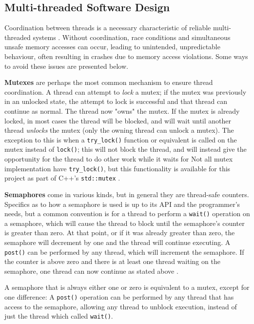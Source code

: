 \documentclass[11pt, a4paper, twocolumn]{article}
\begin{document}
\subsection{Multi-threaded Software Design}

Coordination between threads is a necessary characteristic of reliable multi-threaded systems \citep{Powell}. Without coordination, race conditions and simultaneous unsafe memory accesses can occur, leading to unintended, unpredictable behaviour, often resulting in crashes due to memory access violations. Some ways to avoid these issues are presented below.

\textbf{Mutexes} are perhaps the most common mechanism to ensure thread coordination. A thread can attempt to \emph{lock} a mutex; if the mutex was previously in an unlocked state, the attempt to lock is successful and that thread can continue as normal. The thread now "owns" the mutex. If the mutex is already locked, in most cases the thread will be blocked, and will wait until another thread \emph{unlocks} the mutex (only the owning thread can unlock a mutex). The exception to this is when a \verb|try_lock()| function or equivalent is called on the mutex instead of \verb|lock()|; this will not block the thread, and will instead give the opportunity for the thread to do other work while it waits for  Not all mutex implementation have \verb|try_lock()|, but this functionality is available for this project as part of C++'s \verb|std::mutex| \citep{CppMutex}.

\textbf{Semaphores} come in various kinds, but in general they are thread-safe counters. Specifics as to how a semaphore is used is up to its API and the programmer's needs, but a common convention is for a thread to perform a \verb|wait()| operation on a semaphore, which will cause the thread to block until the semaphore's counter is greater than zero. At that point, or if it was already greater than zero, the semaphore will decrement by one and the thread will continue executing. A \verb|post()| can be performed by any thread, which will increment the semaphore. If the counter is above zero and there is at least one thread waiting on the semaphore, one thread can now continue as stated above \citep{BoostSync}.

A semaphore that is always either one or zero is equivalent to a mutex, except for one difference: A \verb|post()| operation can be performed by any thread that has access to the semaphore, allowing any thread to unblock execution, instead of just the thread which called \verb|wait()|.
\end{document}
